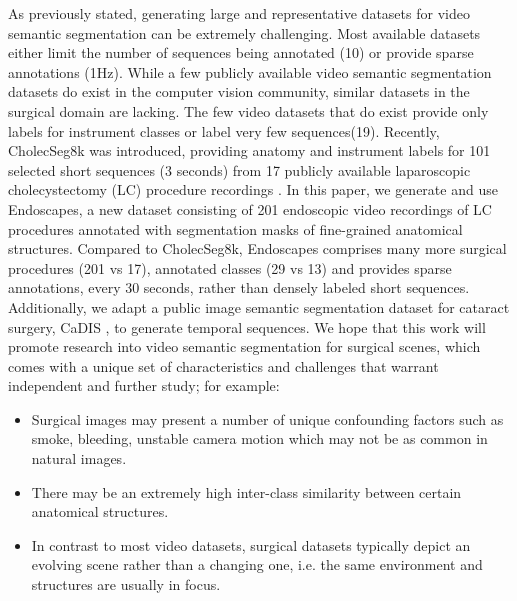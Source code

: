 \documentclass[twoside, print]{ieeecolor_arxiv}
\begin{document}
As previously stated, generating large and representative datasets for video semantic segmentation can be extremely challenging. Most available datasets either limit the number of sequences being annotated (10)\cite{camvid} or provide sparse annotations (1Hz)\cite{cityscapes}. While a few publicly available video semantic segmentation datasets do exist in the computer vision community, similar datasets in the surgical domain are lacking. The few video datasets that do exist provide only labels for instrument classes \cite{robustmis2017}\cite{cata7} or label very few sequences(19)\cite{2018roboscene}. Recently, CholecSeg8k\cite{cholecseg8k} was introduced, providing anatomy and instrument labels for 101 selected short sequences (3 seconds) from 17 publicly available laparoscopic cholecystectomy (LC) procedure recordings \cite{endonet}. In this paper, we generate and use Endoscapes, a new dataset consisting of 201 endoscopic video recordings of LC procedures annotated with segmentation masks of fine-grained anatomical structures. Compared to CholecSeg8k, Endoscapes comprises many more surgical procedures (201 vs 17), annotated classes (29 vs 13) and provides sparse annotations, every 30 seconds, rather than densely labeled short sequences. Additionally, we adapt a public image semantic segmentation dataset for cataract surgery, CaDIS \cite{cadis}, to generate temporal sequences. We hope that this work will promote research into video semantic segmentation for surgical scenes, which comes with a unique set of characteristics and challenges that warrant independent and further study; for example:

\begin{itemize}
    \item Surgical images may present a number of unique confounding factors such as smoke, bleeding, unstable camera motion which may not be as common in natural images.
    \item There may be an extremely high inter-class similarity between certain anatomical structures.
    \item In contrast to most video datasets, surgical datasets typically depict an evolving scene rather than a changing one, i.e. the same environment and structures are usually in focus.
\end{itemize}
\end{document}
